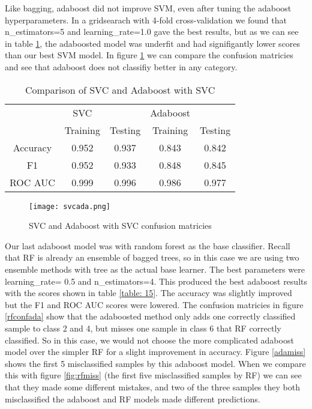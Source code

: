 \documentclass[12pt]{article}
\begin{document}
\FloatBarrier

Like bagging, adaboost did not improve SVM, even after tuning the adaboost hyperparameters. In a gridsearach with 4-fold cross-validation we found that n\_estimators=5 and learning\_rate=1.0 gave the best results, but as we can see in table \ref{table: 14}, the adaboosted model was underfit and had signifigantly lower scores than our best SVM model. In figure \ref{svcada} we can compare the confusion matricies and see that adaboost does not classifiy better in any category.

\begin{table}[h!]
	\centering
	\begin{tabular}{| c|cc|cc|} 
		\hline
		&SVC&&Adaboost&\\
		& Training & Testing& Training & Testing\\ \hline
		Accuracy & 0.952& 0.937 & 0.843 &0.842 \\ 
		F1  &  0.952 &0.933&  0.848 &0.845\\ 
		ROC AUC & 0.999 & 0.996 & 0.986 &0.977\\
		\hline
	\end{tabular}
	\caption{Comparison of SVC and Adaboost with SVC}
	\label{table: 14}
\end{table}

\begin{figure}[h]
	\centering
	\texttt{[image: svcada.png]}
	\caption{SVC and Adaboost with SVC confusion matricies}
	\label{svcada}
\end{figure}

\FloatBarrier

Our last adaboost model was with random forest as the base classifier. Recall that RF is already an ensemble of bagged trees, so in this case we are using two ensemble methods with tree as the actual base learner. The best parameters were learning\_rate= 0.5 and n\_estimators=4. This produced the best adaboost results with the scores shown in table \ref{table: 15}. The accuracy was slightly improved but the F1 and ROC AUC scores were lowered. The confusion matricies in figure \ref{rfconfada} show that the adaboosted method only adds one correctly classified sample to class 2 and 4, but misses one sample in class 6 that RF correctly classified. So in this case, we would not choose the more complicated adaboost model over the simpler RF for a slight improvement in accuracy. Figure \ref{adamiss} shows the first 5 misclassified samples by this adaboost model. When we compare this with figure \ref{fig:rfmiss} (the first five misclassified samples by RF) we can see that they made some different mistakes, and two of the three samples they both misclassified the adaboost and RF models made different predictions.
\end{document}
